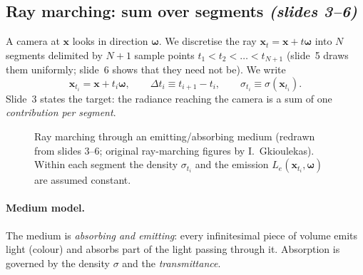 \documentclass[11pt,a4paper]{article}
\newcommand{\sref}[1]{\texorpdfstring{\emph{(slides #1)}}{(slides #1)}}
\newcommand{\om}{\boldsymbol{\omega}}
\newcommand{\xx}{\boldsymbol{x}}
\newcommand{\Le}{L_e}
\theoremstyle{definition}
\theoremstyle{plain}
\theoremstyle{remark}
\begin{document}
\subsection{Ray marching: sum over segments \sref{3--6}}

A camera at $\xx$ looks in direction $\om$. We discretise the ray $\xx_t=\xx+t\om$ into $N$ segments delimited by $N+1$ sample points $t_1<t_2<\dots<t_{N+1}$ (slide~5 draws them uniformly; slide~6 shows that they need not be). We write
\[
\xx_{t_i}=\xx+t_i\om,\qquad \Delta t_i\equiv t_{i+1}-t_i,\qquad \sigma_{t_i}\equiv\sigma(\xx_{t_i}).
\]
Slide~3 states the target: the radiance reaching the camera is a sum of one \emph{contribution per segment}.

\begin{figure}[H]
\centering
{}
\caption{Ray marching through an emitting/absorbing medium (redrawn from slides 3--6; original ray-marching figures by I.\ Gkioulekas). Within each segment the density $\sigma_{t_i}$ and the emission $\Le(\xx_{t_i},\om)$ are assumed constant.}
\end{figure}

\paragraph{Medium model.} The medium is \emph{absorbing and emitting}: every infinitesimal piece of volume emits light (colour) and absorbs part of the light passing through it. Absorption is governed by the density $\sigma$ and the \emph{transmittance}.
\end{document}
